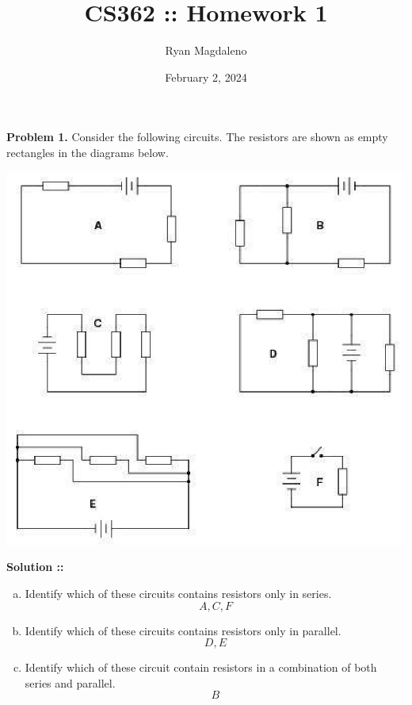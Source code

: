 \documentclass[11pt]{article}
\date{February 2, 2024}
\title{CS362 :\hspace{2px}: Homework 1}
\author{Ryan Magdaleno}
\begin{document}
\maketitle


\textbf{Problem 1.} Consider the following circuits. The resistors are shown as
empty rectangles in the diagrams below.
\begin{center}
    \includegraphics[scale=0.2]{1.png}
\end{center}

\vspace{5px}\textbf{Solution ::}
\begin{enumerate}[a)]
\item
Identify which of these circuits contains resistors only in series.
$$A, C, F$$

\item
Identify which of these circuits contains resistors only in parallel.
$$D, E$$

\item
Identify which of these circuit contain resistors in a combination of 
both series and parallel.
$$B$$

\end{enumerate}
\pagebreak

\end{document}

